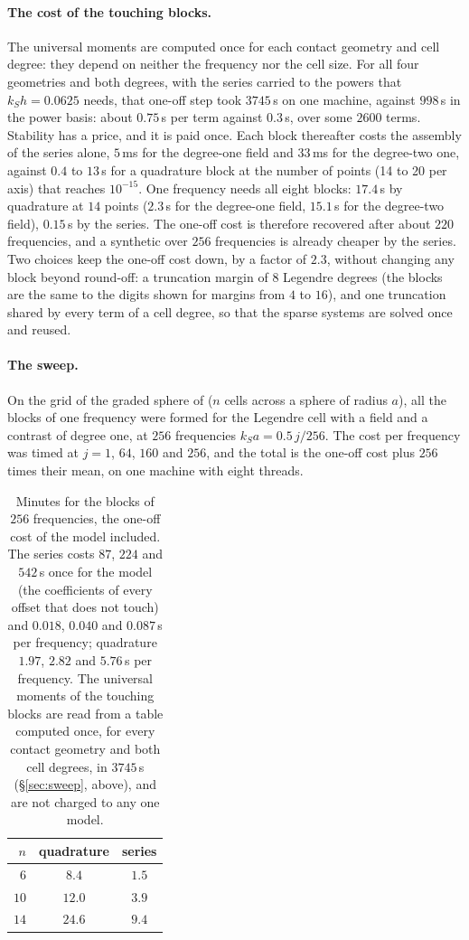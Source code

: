 \documentclass[11pt,a4paper]{article}
\begin{document}
\paragraph{The cost of the touching blocks.} The universal moments are computed once for each contact geometry and cell degree: they
depend on neither the frequency nor the cell size. For all four geometries and both degrees, with the
series carried to the powers that $k_Sh=0.0625$ needs, that one-off step took $3745$\,s on one machine,
against $998$\,s in the power basis: about $0.75$\,s per term against $0.3$\,s, over some
$2600$ terms. Stability has a price, and it is paid once. Each block thereafter costs the assembly of the
series alone, $5$\,ms for the degree-one field and $33$\,ms for the degree-two one, against $0.4$ to $13$\,s for
a quadrature block at the number of points (14 to 20 per axis) that reaches $10^{-15}$. One frequency
needs all eight blocks: $17.4$\,s by quadrature at $14$ points ($2.3$\,s for the degree-one field, $15.1$\,s
for the degree-two field), $0.15$\,s by the series. The one-off cost is therefore recovered after about $220$
frequencies, and a synthetic over $256$ frequencies is already cheaper by the series. Two choices keep the one-off cost down, by a factor of $2.3$, without changing any
block beyond round-off: a truncation margin of $8$ Legendre degrees (the blocks are the same to the digits
shown for margins from $4$ to $16$), and one truncation shared by every term of a cell degree, so that the
sparse systems are solved once and reused.

\paragraph{The sweep.} On the grid of the graded sphere of \citet{NestorError2026} ($n$ cells across a
sphere of radius $a$), all the blocks of one frequency were formed for the Legendre cell with a field and a contrast of degree
one, at $256$
frequencies $k_Sa=0.5\,j/256$. The cost per frequency was timed at $j=1$, $64$, $160$ and $256$, and the
total is the one-off cost plus $256$ times their mean, on one machine with eight threads.

\begin{table}[h]
\centering
\small
\begin{tabular}{rcc}
\toprule
$n$ & quadrature & series \\
\midrule
$6$  & $8.4$  & $1.5$ \\
$10$ & $12.0$ & $3.9$ \\
$14$ & $24.6$ & $9.4$ \\
\bottomrule
\end{tabular}
\caption{Minutes for the blocks of $256$ frequencies, the one-off cost of the model included. The series costs
$87$, $224$ and $542$\,s once for the model (the coefficients of every offset that does not touch) and $0.018$,
$0.040$ and $0.087$\,s per frequency; quadrature $1.97$, $2.82$ and $5.76$\,s per frequency. The universal
moments of the touching blocks are read from a table computed once, for every contact geometry and both cell
degrees, in $3745$\,s (\S\ref{sec:sweep}, above), and are not charged to any one model.}
\label{tab:sweep}
\end{table}
\end{document}
